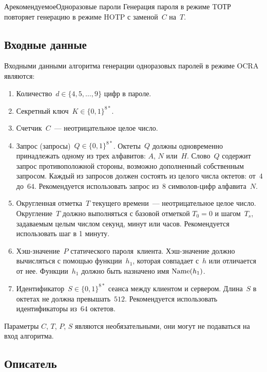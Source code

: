 \begin{appendix}{А}{рекомендуемое}{Одноразовые пароли}
Генерация пароля в режиме TОТР повторяет генерацию в режиме HOTP
с заменой~$C$ на~$T$.

\label{OTP.OCRA}

\subsection{Входные данные}

Входными данными алгоритма генерации одноразовых паролей
в режиме OCRA являются:
\begin{enumerate}
\item
Количество~$d\in\{4,5,\ldots,9\}$ цифр в пароле.

\item
Секретный ключ~$K\in\{0,1\}^{8*}$.

\item
Счетчик~$C$~--- неотрицательное целое число.

\item
Запрос (запросы)~$Q\in\{0,1\}^{8*}$.
Октеты~$Q$ должны одновременно принадлежать одному из трех алфавитов:
$A$, $N$ или~$H$. 
%
Слово~$Q$ содержит запрос противоположной стороны,
возможно дополненный собственным запросом.
%
Каждый из запросов должен состоять из целого числа 
октетов: от~$4$ до~$64$. Рекомендуется использовать 
запрос из~$8$ символов-цифр алфавита~$N$.

\item
Округленная отметка~$T$ текущего времени~--- неотрицательное целое число. 
Округление~$T$ должно выполняться с базовой отметкой $T_0=0$ 
и шагом~$T_s$, задаваемым целым числом секунд, минут или часов.
Рекомендуется использовать шаг в 1 минуту. 

\item
Хэш-значение~$P$ статического пароля~клиента.
Хэш-значение должно вычисляться с помощью функции~$h_1$,
которая совпадает с~$h$ или отличается от нее.
Функции~$h_1$ должно быть назначено имя $\text{Name}(h_1)$.

\item
Идентификатор~$S\in\{0,1\}^{8*}$ сеанса между клиентом и сервером.
Длина~$S$ в октетах не должна превышать~$512$.
Рекомендуется использовать идентификаторы из~$64$ октетов.
\end{enumerate}

Параметры $C$, $T$, $P$, $S$ являются необязательными, 
они могут не подаваться на вход алгоритма.

\subsection{Описатель}


\end{appendix}
